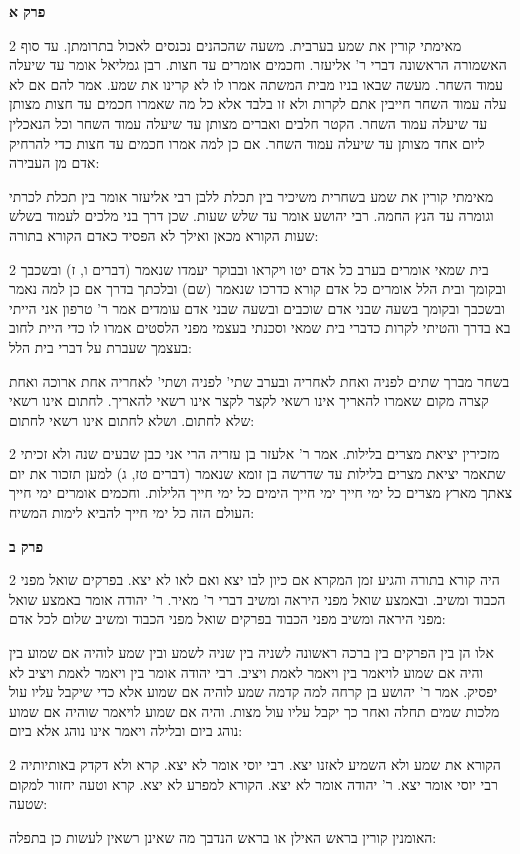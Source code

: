\documentclass[12pt, openany]{book}
\newcommand{\sethebfont}{
\fontsize{10.5pt}{21.0pt} \selectfont
}
\newcommand{\twocol}[1]{
	{\sethebfont \begin{multicols}{2}
			#1
	\end{multicols}}	
}
\newcommand{\sectname}{}
\newcommand{\newsection}[1]{
	\addcontentsline{toc}{section}{#1}
	\renewcommand{\sectname}{#1}	
	\vspace{-\baselineskip}
	\begin{center}
		\textbf{%
\fontsize{16pt}{16pt}\selectfont
			#1}
	\end{center}
	\vspace{-\baselineskip}
	\nopagebreak
}
\begin{document}
\newsection{פרק א}
\twocol{מאימתי קורין את שמע בערבית. משעה שהכהנים נכנסים לאכול בתרומתן. עד סוף האשמורה הראשונה דברי ר' אליעזר. וחכמים אומרים עד חצות. רבן גמליאל אומר עד שיעלה עמוד השחר. מעשה שבאו בניו מבית המשתה אמרו לו לא קרינו את שמע. אמר להם אם לא עלה עמוד השחר חייבין אתם לקרות ולא זו בלבד אלא כל מה שאמרו חכמים עד חצות מצותן עד שיעלה עמוד השחר. הקטר חלבים ואברים מצותן עד שיעלה עמוד השחר וכל הנאכלין ליום אחד מצותן עד שיעלה עמוד השחר. אם כן למה אמרו חכמים עד חצות כדי להרחיק אדם מן העבירה: 
\par מאימתי קורין את שמע בשחרית משיכיר בין תכלת ללבן רבי אליעזר אומר בין תכלת לכרתי וגומרה עד הנץ החמה. רבי יהושע אומר עד שלש שעות. שכן דרך בני מלכים לעמוד בשלש שעות הקורא מכאן ואילך לא הפסיד כאדם הקורא בתורה: }
\twocol{בית שמאי אומרים בערב כל אדם יטו ויקראו ובבוקר יעמדו שנאמר (דברים ו, ז) ובשכבך ובקומך ובית הלל אומרים כל אדם קורא כדרכו שנאמר (שם) ובלכתך בדרך אם כן למה נאמר ובשכבך ובקומך בשעה שבני אדם שוכבים ובשעה שבני אדם עומדים אמר ר' טרפון אני הייתי בא בדרך והטיתי לקרות כדברי בית שמאי וסכנתי בעצמי מפני הלסטים אמרו לו כדי היית לחוב בעצמך שעברת על דברי בית הלל: 
\par בשחר מברך שתים לפניה ואחת לאחריה ובערב שתי' לפניה ושתי' לאחריה אחת ארוכה ואחת קצרה מקום שאמרו להאריך אינו רשאי לקצר לקצר אינו רשאי להאריך. לחתום אינו רשאי שלא לחתום. ושלא לחתום אינו רשאי לחתום: }
\twocol{מזכירין יציאת מצרים בלילות. אמר ר' אלעזר בן עזריה הרי אני כבן שבעים שנה ולא זכיתי שתאמר יציאת מצרים בלילות עד שדרשה בן זומא שנאמר (דברים טז, ג) למען תזכור את יום צאתך מארץ מצרים כל ימי חייך ימי חייך הימים כל ימי חייך הלילות. וחכמים אומרים ימי חייך העולם הזה כל ימי חייך להביא לימות המשיח: }
\newsection{פרק ב}
\twocol{היה קורא בתורה והגיע זמן המקרא אם כיון לבו יצא ואם לאו לא יצא. בפרקים שואל מפני הכבוד ומשיב. ובאמצע שואל מפני היראה ומשיב דברי ר' מאיר. ר' יהודה אומר באמצע שואל מפני היראה ומשיב מפני הכבוד בפרקים שואל מפני הכבוד ומשיב שלום לכל אדם: 
\par אלו הן בין הפרקים בין ברכה ראשונה לשניה בין שניה לשמע ובין שמע לוהיה אם שמוע בין והיה אם שמוע לויאמר בין ויאמר לאמת ויציב. רבי יהודה אומר בין ויאמר לאמת ויציב לא יפסיק. אמר ר' יהושע בן קרחה למה קדמה שמע לוהיה אם שמוע אלא כדי שיקבל עליו עול מלכות שמים תחלה ואחר כך יקבל עליו עול מצות. והיה אם שמוע לויאמר שוהיה אם שמוע נוהג ביום ובלילה ויאמר אינו נוהג אלא ביום: }
\twocol{הקורא את שמע ולא השמיע לאזנו יצא. רבי יוסי אומר לא יצא. קרא ולא דקדק באותיותיה רבי יוסי אומר יצא. ר' יהודה אומר לא יצא. הקורא למפרע לא יצא. קרא וטעה יחזור למקום שטעה: 
\par האומנין קורין בראש האילן או בראש הנדבך מה שאינן רשאין לעשות כן בתפלה: }
\end{document}
